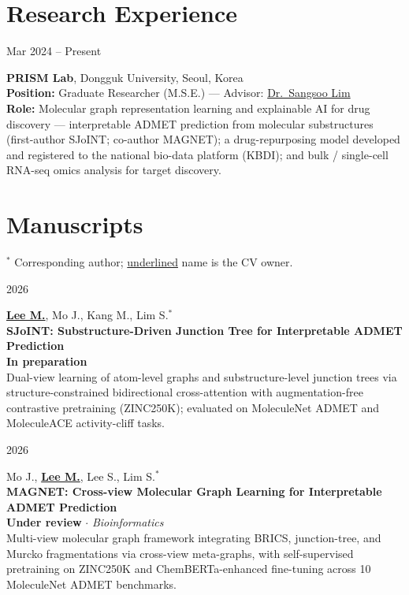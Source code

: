 \documentclass[10.5pt,a4paper]{article}
\newcommand{\entry}[2]{%
  \noindent
  \begin{minipage}[t]{0.16\linewidth}\raggedright{\small\color{muted}#1}\end{minipage}%
  \hspace{0.02\linewidth}%
  \begin{minipage}[t]{0.80\linewidth}\raggedright #2\end{minipage}%
  \par\vspace{3.5pt}%
}
\newcommand{\me}[1]{\textbf{\underline{#1}}}
\begin{document}
\section{Research Experience}
\entry{Mar 2024 -- Present}{\textbf{PRISM Lab}, Dongguk University, Seoul, Korea \\
{\color{muted}\textbf{Position:} Graduate Researcher (M.S.E.) --- Advisor: \href{https://scholar.google.com/citations?user=d19A738AAAAJ}{Dr.\ Sangsoo Lim}} \\
{\color{muted}\textbf{Role:} Molecular graph representation learning and explainable AI for drug discovery --- interpretable ADMET prediction from molecular substructures (first-author SJoINT; co-author MAGNET); a drug-repurposing model developed and registered to the national bio-data platform (KBDI); and bulk / single-cell RNA-seq omics analysis for target discovery.}}

\section{Manuscripts}
{\small\color{muted}$^{*}$ Corresponding author; \underline{underlined} name is the CV owner.}\\[3pt]
\entry{2026}{\me{Lee M.}, Mo J., Kang M., Lim S.$^{*}$ \\ \textbf{SJoINT: Substructure-Driven Junction Tree for Interpretable ADMET Prediction} \\ {\color{accent}\textbf{In preparation}} \\ {\color{muted}Dual-view learning of atom-level graphs and substructure-level junction trees via structure-constrained bidirectional cross-attention with augmentation-free contrastive pretraining (ZINC250K); evaluated on MoleculeNet ADMET and MoleculeACE activity-cliff tasks.}}
\entry{2026}{Mo J., \me{Lee M.}, Lee S., Lim S.$^{*}$ \\ \textbf{MAGNET: Cross-view Molecular Graph Learning for Interpretable ADMET Prediction} \\ {\color{accent}\textbf{Under review}} {\color{muted}$\cdot$ \textit{Bioinformatics}} \\ {\color{muted}Multi-view molecular graph framework integrating BRICS, junction-tree, and Murcko fragmentations via cross-view meta-graphs, with self-supervised pretraining on ZINC250K and ChemBERTa-enhanced fine-tuning across 10 MoleculeNet ADMET benchmarks.}}
\end{document}
